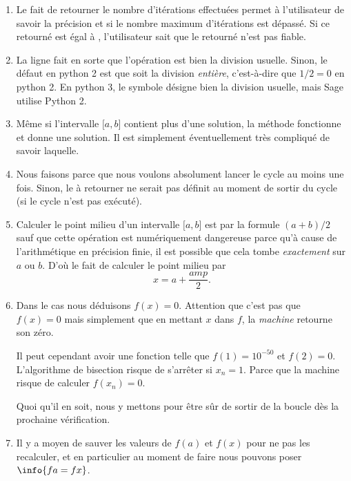 \begin{enumerate}
	\item
	      Le fait de retourner le nombre d'itérations effectuées permet à l'utilisateur de savoir la précision et si le nombre maximum d'itérations est dépassé. Si ce  retourné est égal à , l'utilisateur sait que le  retourné n'est pas fiable.
	\item
	      La ligne  fait en sorte que l'opération \info{/} est bien la division usuelle. Sinon, le défaut en python 2 est que \info{/} soit la division \emph{entière}, c'est-à-dire que \( 1/2=0\) en python 2.
	      En python 3, le symbole \info{/} désigne bien la division usuelle, mais Sage utilise Python 2.
	\item
	      Même si l'intervalle \( \mathopen[ a , b \mathclose]\) contient plus d'une solution, la méthode fonctionne et donne une solution. Il est simplement éventuellement très compliqué de savoir laquelle.
	\item
	      Nous faisons  parce que nous voulons absolument lancer le cycle au moins une fois. Sinon, le  à retourner ne serait pas définit au moment de sortir du cycle (si le cycle n'est pas exécuté).
	\item
	      Calculer le point milieu d'un intervalle \( \mathopen[ a , b \mathclose]\) est par la formule \( (a+b)/2\) sauf que cette opération est numériquement dangereuse parce qu'à cause de l'arithmétique en précision finie, il est possible que cela tombe \emph{exactement} sur \( a\) ou \( b\). D'où le fait de calculer le point milieu par
	      \begin{equation}
		      x=a+\frac{ amp }{2}.
	      \end{equation}
	\item
	      Dans le cas  nous déduisons \( f(x)=0\). Attention que c'est pas que \( f(x)=0\) mais simplement que en mettant \( x\) dans \( f\), la \emph{machine} retourne son zéro.

	      Il peut cependant avoir une fonction telle que \( f(1)=10^{-50}\) et \( f(2)=0\). L'algorithme de bisection risque de s'arrêter si \( x_n=1\). Parce que la machine risque de calculer \( f(x_n)=0\).

	      Quoi qu'il en soit, nous y mettons  pour être sûr de sortir de la boucle dès la prochaine vérification.
	\item
	      Il y a moyen de sauver les valeurs de \( f(a)\) et \( f(x)\) pour ne pas les recalculer, et en particulier au moment de faire  nous pouvons poser \(\info{fa=fx}\).
\end{enumerate}

